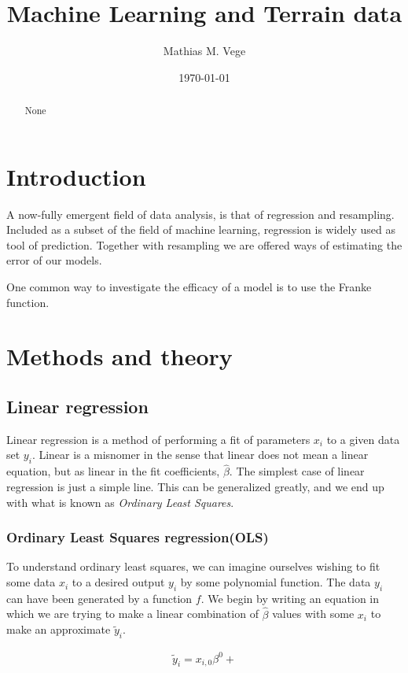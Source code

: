 \documentclass[11pt]{article}
\title{Machine Learning and Terrain data}
\author{Mathias M. Vege}
\date{\today}
\begin{document}
\maketitle

\begin{abstract}
None
\end{abstract}

\tableofcontents

\section{Introduction}
A now-fully emergent field of data analysis, is that of regression and resampling. Included as a subset of the field of machine learning, regression is widely used as tool of prediction. Together with resampling we are offered ways of estimating the error of our models.

One common way to investigate the efficacy of a model is to use the Franke function\cite{franke1979critical}.

\section{Methods and theory}
\subsection{Linear regression}
Linear regression is a method of performing a fit of parameters $x_i$ to a given data set $y_i$. Linear is a misnomer in the sense that linear does not mean a linear equation, but as linear in the fit coefficients, $\hat{\beta}$. The simplest case of linear regression is just a simple line\citep[ch. 3.1, p. 61]{james2013introduction}. This can be generalized greatly, and we end up with what is known as \textit{Ordinary Least Squares}.

\subsubsection{Ordinary Least Squares regression(OLS)}
To understand ordinary least squares, we can imagine ourselves wishing to fit some data $x_i$ to a desired output $y_i$ by some polynomial function. The data $y_i$ can have been generated by a function $f$. We begin by writing an equation in which we are trying to make a linear combination of $\hat{\beta}$ values with some $x_i$ to make an approximate $\tilde{y}_i$.

\begin{align*}
    \tilde{y}_i = x_{i,0}\beta^0 + 
\end{align*}
\end{document}

